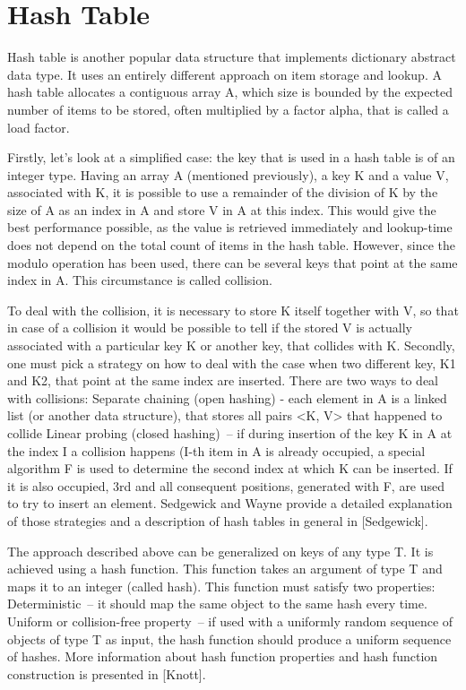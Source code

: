\section{Hash Table}

Hash table is another popular data structure that implements dictionary abstract data type. It uses an entirely different approach on item storage and lookup. A hash table allocates a contiguous array A, which size is bounded by the expected number of items to be stored, often multiplied by a factor alpha, that is called a load factor.

Firstly, let’s look at a simplified case: the key that is used in a hash table is of an integer type. Having an array A (mentioned previously), a key K and a value V, associated with K, it is possible to use a remainder of the division of K by the size of A as an index in A and store V in A at this index. This would give the best performance possible, as the value is retrieved immediately and lookup-time does not depend on the total count of items in the hash table. However, since the modulo operation has been used, there can be several keys that point at the same index in A. This circumstance is called collision.

To deal with the collision, it is necessary to store K itself together with V, so that in case of a collision it would be possible to tell if the stored V is actually associated with a particular key K or another key, that collides with K. Secondly, one must pick a strategy on how to deal with the case when two different key, K1 and K2, that point at the same index are inserted. There are two ways to deal with collisions:
Separate chaining (open hashing) - each element in A is a linked list (or another data structure), that stores all pairs <K, V> that happened to collide
Linear probing (closed hashing)~-- if during insertion of the key K in A at the index I a collision happens (I-th item in A is already occupied, a special algorithm F is used to determine the second index at which K can be inserted. If it is also occupied, 3rd and all consequent positions, generated with F, are used to try to insert an element.
Sedgewick and Wayne provide a detailed explanation of those strategies and a description of hash tables in general in [Sedgewick].

The approach described above can be generalized on keys of any type T. It is achieved using a hash function. This function takes an argument of type T and maps it to an integer (called hash). This function must satisfy two properties:
Deterministic~-- it should map the same object to the same hash every time.
Uniform or collision-free property~-- if used with a uniformly random sequence of objects of type T as input, the hash function should produce a uniform sequence of hashes.
More information about hash function properties and hash function construction is presented in [Knott].

